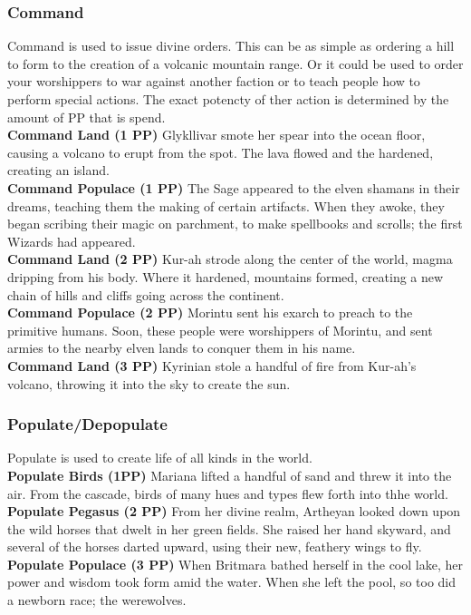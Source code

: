 \documentclass[10pt,a4paper]{article}
\begin{document}
\subsubsection*{Command}
Command is used to issue divine orders. This can be as simple as ordering a hill to form to the creation of a volcanic mountain range. Or it could be used to order your worshippers to war against another faction or to teach people how to perform special actions. The exact potencty of ther action is determined by the amount of PP that is spend.\\
\textbf{Command Land (1 PP)} Glykllivar smote her spear into the ocean floor, causing a volcano to erupt from the spot. The lava flowed and the hardened, creating an island.\\
\textbf{Command Populace (1 PP)} The Sage appeared to the elven shamans in their dreams, teaching them the making of certain artifacts. When they awoke, they began scribing their magic on parchment, to make spellbooks and scrolls; the first Wizards had appeared.\\
\textbf{Command Land (2 PP)} Kur-ah strode along the center of the world, magma dripping from his body. Where it hardened, mountains formed, creating a new chain of hills and cliffs going across the continent.\\
\textbf{Command Populace (2 PP)} Morintu sent his exarch to preach to the primitive humans. Soon, these people were worshippers of Morintu, and sent armies to the nearby elven lands to conquer them in his name.\\
\textbf{Command Land (3 PP)} Kyrinian stole a handful of fire from Kur-ah's volcano, throwing it into the sky to create the sun.

\subsubsection*{Populate/Depopulate}
Populate is used to create life of all kinds in the world. \\
\textbf{Populate Birds (1PP)} Mariana lifted a handful of sand and threw it into the air. From the cascade, birds of many hues and types flew forth into thhe world.\\
\textbf{Populate Pegasus (2 PP)} From her divine realm, Artheyan looked down upon the wild horses that dwelt in her green fields. She raised her hand skyward, and several of the horses darted upward, using their new, feathery wings to fly.\\
\textbf{Populate Populace (3 PP)} When Britmara bathed herself in the cool lake, her power and wisdom took form amid the water. When she left the pool, so too did a newborn race; the werewolves.
\end{document}
